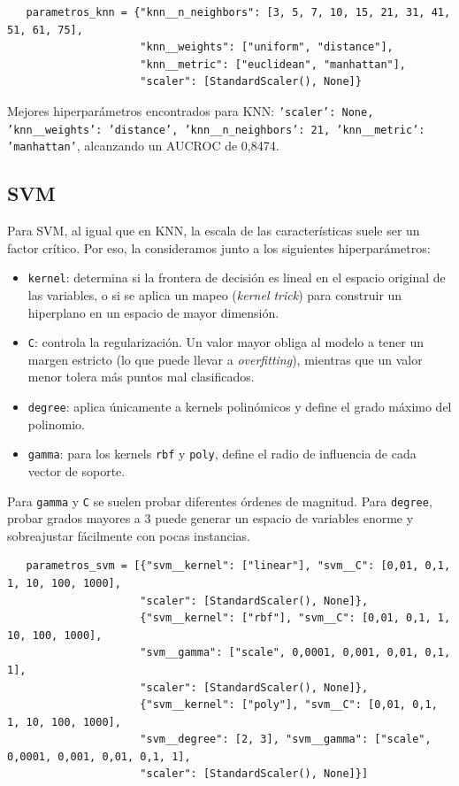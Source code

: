 \documentclass[10pt,a4paper]{article}
\begin{document}
\begin{lstlisting}
   parametros_knn = {"knn__n_neighbors": [3, 5, 7, 10, 15, 21, 31, 41, 51, 61, 75],
                     "knn__weights": ["uniform", "distance"], 
                     "knn__metric": ["euclidean", "manhattan"], 
                     "scaler": [StandardScaler(), None]}  
\end{lstlisting}

Mejores hiperparámetros encontrados para KNN: \texttt{'scaler': None, 'knn\_\_weights': 'distance', 'knn\_\_n\_neighbors': 21, 'knn\_\_metric': 'manhattan'}, alcanzando un AUCROC de 0,8474.

\subsection{SVM}
Para SVM, al igual que en KNN, la escala de las características suele ser un factor crítico. Por eso, la consideramos junto a los siguientes hiperparámetros:

\begin{itemize}
   \item \texttt{kernel}: determina si la frontera de decisión es lineal en el espacio original de las variables, o si se aplica un mapeo (\textit{kernel trick}) para construir un hiperplano en un espacio de mayor dimensión.
   \item \texttt{C}: controla la regularización. Un valor mayor obliga al modelo a tener un margen estricto (lo que puede llevar a \textit{overfitting}), mientras que un valor menor tolera más puntos mal clasificados.
   \item \texttt{degree}: aplica únicamente a kernels polinómicos y define el grado máximo del polinomio.
   \item \texttt{gamma}: para los kernels \texttt{rbf} y \texttt{poly}, define el radio de influencia de cada vector de soporte.
\end{itemize}

Para \texttt{gamma} y \texttt{C} se suelen probar diferentes órdenes de magnitud. Para \texttt{degree}, probar grados mayores a 3 puede generar un espacio de variables enorme y sobreajustar fácilmente con pocas instancias.

\begin{lstlisting}
   parametros_svm = [{"svm__kernel": ["linear"], "svm__C": [0,01, 0,1, 1, 10, 100, 1000], 
                     "scaler": [StandardScaler(), None]},
                     {"svm__kernel": ["rbf"], "svm__C": [0,01, 0,1, 1, 10, 100, 1000], 
                     "svm__gamma": ["scale", 0,0001, 0,001, 0,01, 0,1, 1], 
                     "scaler": [StandardScaler(), None]},
                     {"svm__kernel": ["poly"], "svm__C": [0,01, 0,1, 1, 10, 100, 1000],
                     "svm__degree": [2, 3], "svm__gamma": ["scale", 0,0001, 0,001, 0,01, 0,1, 1], 
                     "scaler": [StandardScaler(), None]}]
\end{lstlisting}
\end{document}
